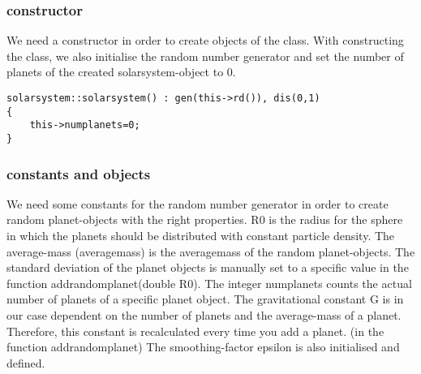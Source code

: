 \documentclass[10pt,a4paper]{article}
\begin{document}
\subsubsection{constructor}
We need a constructor in order to create objects of the class. With constructing the class, we also initialise the random number generator and set the number of planets of the created solarsystem-object to 0. 
\begin{lstlisting}
solarsystem::solarsystem() : gen(this->rd()), dis(0,1)
{
    this->numplanets=0;
}
\end{lstlisting}
\subsubsection{constants and objects}
We need some constants for the random number generator in order to create random planet-objects with the right properties. R0 is the radius for the sphere in which the planets should be distributed with constant particle density. The average-mass (averagemass) is the averagemass of the random planet-objects. The standard deviation of the planet objects is manually set to a specific value in the function addrandomplanet(double R0). The integer numplanets counts the actual number of planets of a specific planet object. The gravitational constant G is in our case dependent on the number of planets and the average-mass of a planet. Therefore, this constant is recalculated every time you add a planet. (in the function addrandomplanet) 
The smoothing-factor epsilon is also initialised and defined. 
\end{document}
